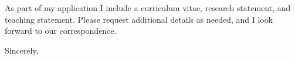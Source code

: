\documentclass[11pt,a4paper]{letter}
\begin{document}
\begin{letter}
As part of my application I include a curriculum vitae, research statement, and teaching statement. Please request additional details as needed, and I look forward to our correspondence.

\closing{Sincerely,}
\end{letter}
\end{document}
